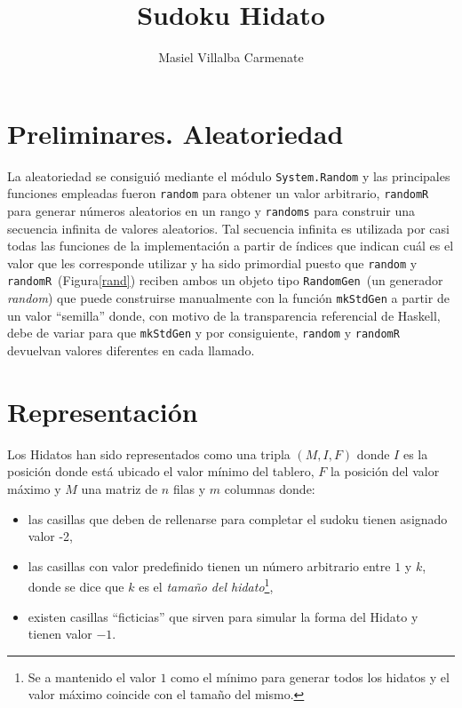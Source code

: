 \documentclass{llncs}
\begin{document}
\title{Sudoku Hidato}

\author{
  Masiel Villalba Carmenate 
  }



\maketitle

\section{Preliminares. Aleatoriedad}
La aleatoriedad se consigui\'o mediante el m\'odulo \texttt{System.Random}\cite{baeza} y las principales funciones empleadas fueron \texttt{random} para obtener un valor arbitrario, \texttt{randomR} para generar n\'umeros aleatorios en un rango y \texttt{randoms} para construir una secuencia infinita de valores aleatorios. Tal secuencia infinita es utilizada por casi todas las funciones de la implementaci\'on a partir de \'indices que indican cu\'al es el valor que les corresponde utilizar y ha sido primordial puesto que \texttt{random} y \texttt{randomR}~(Figura\ref{rand}) reciben ambos un objeto tipo \texttt{RandomGen}~(un generador \emph{random}) que puede construirse manualmente con la funci\'on \texttt{mkStdGen} a partir de un valor ``semilla'' donde, con motivo de la transparencia referencial de Haskell, debe de variar para que \texttt{mkStdGen} y por consiguiente, \texttt{random} y \texttt{randomR} devuelvan valores diferentes en cada llamado.

\section{Representaci\'on}
Los Hidatos han sido representados como una tripla $(M,I,F)$ donde $I$ es la posici\'on donde est\'a ubicado el valor m\'inimo del tablero, $F$ la posici\'on del valor m\'aximo y $M$ una matriz de $n$ filas y $m$ columnas donde:
\begin{itemize}
\item las casillas que deben de rellenarse para completar el sudoku tienen asignado valor -2,
\item las casillas con valor predefinido tienen un n\'umero arbitrario entre $1$ y $k$, donde se dice que $k$ es el \emph{tama\~no del hidato}\footnote{Se a mantenido el valor $1$ como el m\'inimo para generar todos los hidatos y el valor m\'aximo coincide con el tama\~no del mismo.},
\item existen casillas ``ficticias'' que sirven para simular la forma del Hidato y tienen  valor $-1$.
\end{itemize}
\end{document}

